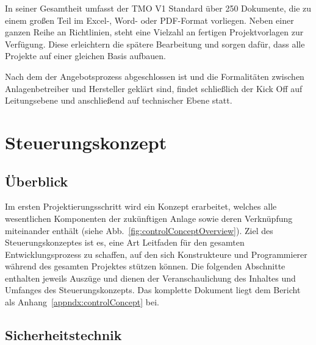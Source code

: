 In seiner Gesamtheit umfasst der TMO V1 Standard über 250 Dokumente, die zu einem großen Teil im Excel-, Word- oder PDF-Format vorliegen. Neben einer ganzen Reihe an Richtlinien, steht eine Vielzahl an fertigen Projektvorlagen zur Verfügung. Diese erleichtern die spätere Bearbeitung und sorgen dafür, dass alle Projekte auf einer gleichen Basis aufbauen.

Nach dem der Angebotsprozess abgeschlossen ist und die Formalitäten zwischen Anlagenbetreiber und Hersteller geklärt sind, findet schließlich der Kick Off auf Leitungsebene und anschließend auf technischer Ebene statt.

\section{Steuerungskonzept}
\label{sec:controlConcept}

\subsection{Überblick}

Im ersten Projektierungsschritt wird ein Konzept erarbeitet, welches alle wesentlichen Komponenten der zukünftigen Anlage sowie deren Verknüpfung miteinander enthält (siehe Abb.~\ref{fig:controlConceptOverview}). Ziel des Steuerungskonzeptes ist es, eine Art Leitfaden für den gesamten Entwicklungsprozess zu schaffen, auf den sich Konstrukteure und Programmierer während des gesamten Projektes stützen können.
Die folgenden Abschnitte enthalten jeweils Auszüge und dienen der Veranschaulichung des Inhaltes und Umfanges des Steuerungskonzepts. Das komplette Dokument liegt dem Bericht als Anhang~\ref{appndx:controlConcept} bei.


\subsection{Sicherheitstechnik}

